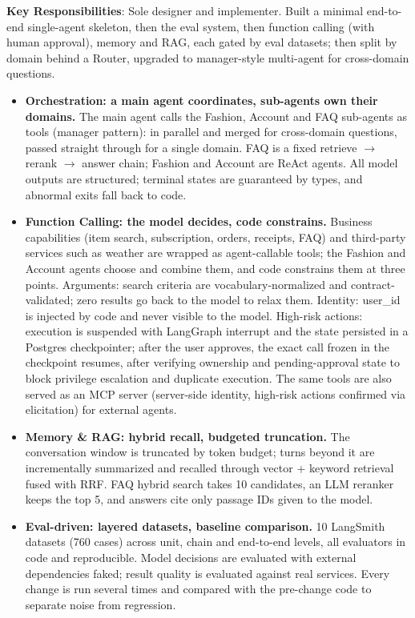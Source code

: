 \documentclass{resume}
\begin{document}
\textbf{Key Responsibilities}: Sole designer and implementer. Built a minimal end-to-end single-agent skeleton, then the eval system, then function calling (with human approval), memory and RAG, each gated by eval datasets; then split by domain behind a Router, upgraded to manager-style multi-agent for cross-domain questions.\\

\begin{itemize}
    \item \textbf{Orchestration: a main agent coordinates, sub-agents own their domains.} The main agent calls the Fashion, Account and FAQ sub-agents as tools (manager pattern): in parallel and merged for cross-domain questions, passed straight through for a single domain. FAQ is a fixed retrieve $\rightarrow$ rerank $\rightarrow$ answer chain; Fashion and Account are ReAct agents. All model outputs are structured; terminal states are guaranteed by types, and abnormal exits fall back to code.
    \item \textbf{Function Calling: the model decides, code constrains.} Business capabilities (item search, subscription, orders, receipts, FAQ) and third-party services such as weather are wrapped as agent-callable tools; the Fashion and Account agents choose and combine them, and code constrains them at three points. Arguments: search criteria are vocabulary-normalized and contract-validated; zero results go back to the model to relax them. Identity: user\_id is injected by code and never visible to the model. High-risk actions: execution is suspended with LangGraph interrupt and the state persisted in a Postgres checkpointer; after the user approves, the exact call frozen in the checkpoint resumes, after verifying ownership and pending-approval state to block privilege escalation and duplicate execution. The same tools are also served as an MCP server (server-side identity, high-risk actions confirmed via elicitation) for external agents.
    \item \textbf{Memory \& RAG: hybrid recall, budgeted truncation.} The conversation window is truncated by token budget; turns beyond it are incrementally summarized and recalled through vector + keyword retrieval fused with RRF. FAQ hybrid search takes 10 candidates, an LLM reranker keeps the top 5, and answers cite only passage IDs given to the model.
    \item \textbf{Eval-driven: layered datasets, baseline comparison.} 10 LangSmith datasets (760 cases) across unit, chain and end-to-end levels, all evaluators in code and reproducible. Model decisions are evaluated with external dependencies faked; result quality is evaluated against real services. Every change is run several times and compared with the pre-change code to separate noise from regression.

\end{itemize}
\end{document}

